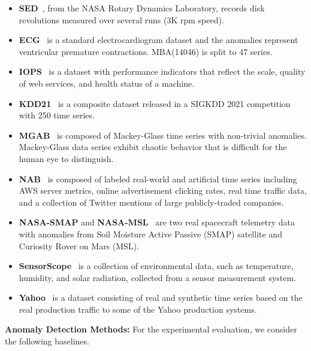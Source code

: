 \begin{itemize}
    \item {\bf SED}~\cite{doi:10.1177/1475921710395811}, from the NASA Rotary Dynamics Laboratory, records disk revolutions measured over several runs (3K rpm speed).
	\item {\bf ECG}~\cite{goldberger_physiobank_2000} is a standard electrocardiogram dataset and the anomalies represent ventricular premature contractions. MBA(14046) is split to $47$ series.
	\item {\bf IOPS}~\cite{IOPS} is a dataset with performance indicators that reflect the scale, quality of web services, and health status of a machine.
	\item {\bf KDD21}~\cite{kdd} is a composite dataset released in a SIGKDD 2021 competition with 250 time series.
	\item {\bf MGAB}~\cite{markus_thill_2020_3762385} is composed of Mackey-Glass time series with non-trivial anomalies. Mackey-Glass data series exhibit chaotic behavior that is difficult for the human eye to distinguish.
	\item {\bf NAB}~\cite{ahmad_unsupervised_2017} is composed of labeled real-world and artificial time series including AWS server metrics, online advertisement clicking rates, real time traffic data, and a collection of Twitter mentions of large publicly-traded companies.
	\item {\bf NASA-SMAP} and {\bf NASA-MSL}~\cite{10.1145/3449726.3459411} are two real spacecraft telemetry data with anomalies from Soil Moisture Active Passive (SMAP) satellite and Curiosity Rover on Mars (MSL).
	\item {\bf SensorScope}~\cite{YAO20101059} is a collection of environmental data, such as temperature, humidity, and solar radiation, collected from a sensor measurement system.
	\item {\bf Yahoo}~\cite{yahoo} is a dataset consisting of real and synthetic time series based on the real production traffic to some of the Yahoo production systems.
\end{itemize}


\textbf{Anomaly Detection Methods: }  For the experimental evaluation, we consider the following baselines. 

